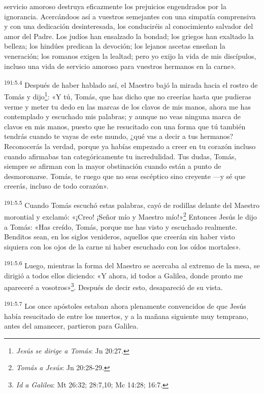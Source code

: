servicio amoroso destruya eficazmente los prejuicios engendrados por la ignorancia. Acercándoos así a vuestros semejantes con una simpatía comprensiva y con una dedicación desinteresada, los conduciréis al conocimiento salvador del amor del Padre. Los judíos han ensalzado la bondad; los griegos han exaltado la belleza; los hindúes predican la devoción; los lejanos ascetas enseñan la veneración; los romanos exigen la lealtad; pero yo exijo la vida de mis discípulos, incluso una vida de servicio amoroso para vuestros hermanos en la carne».

\par 
\textsuperscript{191:5.4} Después de haber hablado así, el Maestro bajó la mirada hacia el rostro de Tomás y dijo\footnote{\textit{Jesús se dirige a Tomás}: Jn 20:27.}: «Y tú, Tomás, que has dicho que no creerías hasta que pudieras verme y meter tu dedo en las marcas de los clavos de mis manos, ahora me has contemplado y escuchado mis palabras; y aunque no veas ninguna marca de clavos en mis manos, puesto que he resucitado con una forma que tú también tendrás cuando te vayas de este mundo, ¿qué vas a decir a tus hermanos? Reconocerás la verdad, porque ya habías empezado a creer en tu corazón incluso cuando afirmabas tan categóricamente tu incredulidad. Tus dudas, Tomás, siempre se afirman con la mayor obstinación cuando están a punto de desmoronarse. Tomás, te ruego que no seas escéptico sino creyente ---y sé que creerás, incluso de todo corazón».

\par 
\textsuperscript{191:5.5} Cuando Tomás escuchó estas palabras, cayó de rodillas delante del Maestro morontial y exclamó: «¡Creo! ¡Señor mío y Maestro mío!»\footnote{\textit{Tomás a Jesús}: Jn 20:28-29.} Entonces Jesús le dijo a Tomás: «Has creído, Tomás, porque me has visto y escuchado realmente. Benditos sean, en los siglos venideros, aquellos que creerán sin haber visto siquiera con los ojos de la carne ni haber escuchado con los oídos mortales».

\par 
\textsuperscript{191:5.6} Luego, mientras la forma del Maestro se acercaba al extremo de la mesa, se dirigió a todos ellos diciendo: «Y ahora, id todos a Galilea, donde pronto me apareceré a vosotros»\footnote{\textit{Id a Galilea}: Mt 26:32; 28:7,10; Mc 14:28; 16:7.}. Después de decir esto, desapareció de su vista.

\par 
\textsuperscript{191:5.7} Los once apóstoles estaban ahora plenamente convencidos de que Jesús había resucitado de entre los muertos, y a la mañana siguiente muy temprano, antes del amanecer, partieron para Galilea.

